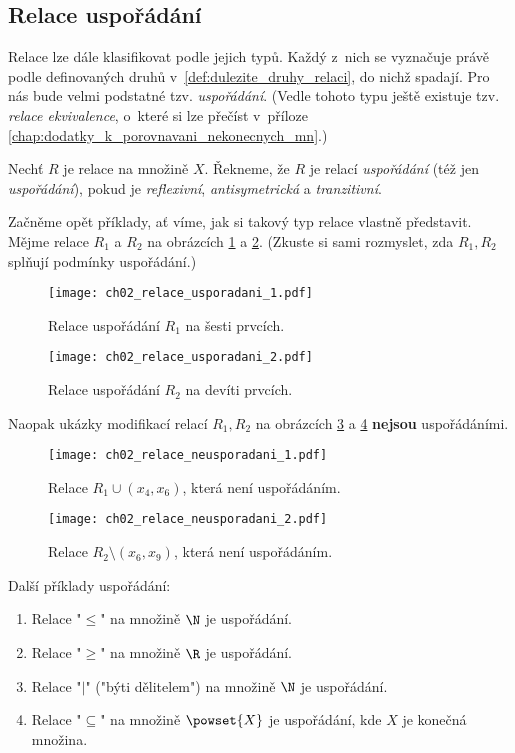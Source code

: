 \subsection{Relace uspořádání}\label{subsec:relace_usporadani}
Relace lze dále klasifikovat podle jejich typů. Každý z~nich se vyznačuje právě podle definovaných druhů v~\ref{def:dulezite_druhy_relaci}, do nichž spadají. Pro nás bude velmi podstatné tzv. \emph{uspořádání}. (Vedle tohoto typu ještě existuje tzv. \emph{relace ekvivalence}, o~které si lze přečíst v~příloze \ref{chap:dodatky_k_porovnavani_nekonecnych_mn}.)
\begin{definition}[Uspořádání]\label{def:usporadani}
    Nechť $R$ je relace na množině $X$. Řekneme, že $R$ je relací \emph{uspořádání} (též jen \emph{uspořádání}), pokud je \emph{reflexivní}, \emph{antisymetrická} a \emph{tranzitivní}.
\end{definition}
Začněme opět příklady, ať víme, jak si takový typ relace vlastně představit. Mějme relace $R_1$ a $R_2$ na obrázcích \ref{fig:relace_usporadani_1} a \ref{fig:relace_usporadani_2}. (Zkuste si sami rozmyslet, zda $R_1,R_2$ splňují podmínky uspořádání.)
\begin{figure}[H]
    \centering
    \texttt{[image: ch02\_relace\_usporadani\_1.pdf]}
    \caption{Relace uspořádání $R_1$ na šesti prvcích.}
    \label{fig:relace_usporadani_1}
\end{figure}
\begin{figure}[H]
    \centering
    \texttt{[image: ch02\_relace\_usporadani\_2.pdf]}
    \caption{Relace uspořádání $R_2$ na devíti prvcích.}
    \label{fig:relace_usporadani_2}
\end{figure}
Naopak ukázky modifikací relací $R_1,R_2$ na obrázcích \ref{fig:relace_neusporadani_1} a \ref{fig:relace_neusporadani_2} \textbf{nejsou} uspořádáními.
\begin{figure}[H]
    \centering
    \texttt{[image: ch02\_relace\_neusporadani\_1.pdf]}
    \caption{Relace $R_1\cup (x_4,x_6)$, která není uspořádáním.}
    \label{fig:relace_neusporadani_1}
\end{figure}
\begin{figure}[H]
    \centering
    \texttt{[image: ch02\_relace\_neusporadani\_2.pdf]}
    \caption{Relace $R_2\setminus (x_6,x_9)$, která není uspořádáním.}
    \label{fig:relace_neusporadani_2}
\end{figure}
\begin{example}
    Další příklady uspořádání:
    \begin{enumerate}[label=(\roman*)]
        \item Relace "$\leq$" na množině $\N$ je uspořádání.
        \item Relace "$\geq$" na množině $\R$ je uspořádání.
        \item Relace "$\mid$" ("býti dělitelem") na množině $\N$ je uspořádání.
        \item Relace "$\subseteq$" na množině $\powset{X}$ je uspořádání, kde $X$ je konečná množina.
    \end{enumerate}
\end{example}
